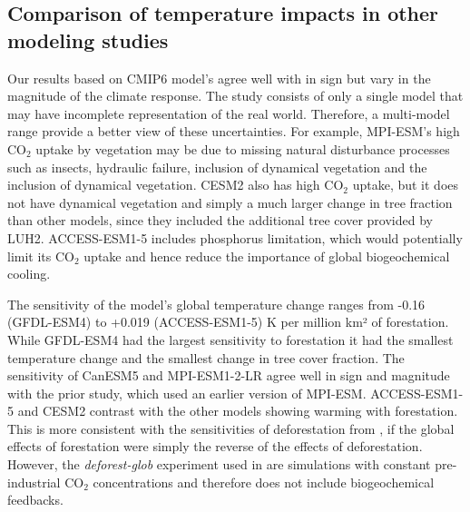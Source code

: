 \documentclass[]{article}
\begin{document}
\subsection{Comparison of temperature impacts in other modeling studies}

Our results based on CMIP6 model's agree well with \cite{sonntag_quantifying_2018} in sign but vary in the magnitude of the climate response.
The \cite{sonntag_quantifying_2018} study consists of only a single model that may have incomplete representation of the real world.
Therefore, a multi-model range provide a better view of these uncertainties.
For example, MPI-ESM's high CO$_2$ uptake by vegetation may be due to missing natural disturbance processes such as insects, hydraulic failure, inclusion of dynamical vegetation and the inclusion of dynamical vegetation.
CESM2 also has high CO$_2$ uptake, but it does not have dynamical vegetation and simply a much larger change in tree fraction than other models, since they included the additional tree cover provided by LUH2.
ACCESS-ESM1-5 includes phosphorus limitation, which would potentially limit its CO$_2$ uptake and hence reduce the importance of global biogeochemical cooling.

The sensitivity of the model's global temperature change ranges from -0.16 (GFDL-ESM4) to +0.019 (ACCESS-ESM1-5) K per million km² of forestation.
While GFDL-ESM4 had the largest sensitivity to forestation it had the smallest temperature change and the smallest change in tree cover fraction.
The sensitivity of CanESM5 and MPI-ESM1-2-LR agree well in sign and magnitude with the prior \cite{sonntag_quantifying_2018} study, which used an earlier version of MPI-ESM.
ACCESS-ESM1-5 and CESM2 contrast with the other models showing warming with forestation.
This is more consistent with the sensitivities of deforestation from \cite{boysen_global_2020}, if the global effects of forestation were simply the reverse of the effects of deforestation.
However, the \textit{deforest-glob} experiment used in \cite{boysen_global_2020} are simulations with constant pre-industrial CO$_2$ concentrations and therefore does not include biogeochemical feedbacks.
\end{document}
